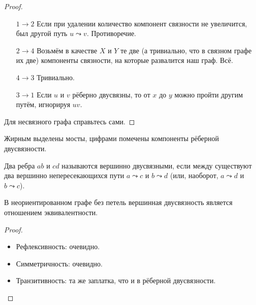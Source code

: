 \documentclass{article}
\begin{document}
    \begin{proof}
        \begin{itemize}
            \item[$1\to2$] Если при удалении количество компонент связности не увеличится, был другой путь $u\leadsto v$. Противоречие.
            \item[$2\to4$] Возьмём в качестве $X$ и $Y$ те две (а тривиально, что в связном графе их две) компоненты связности, на которые развалится наш граф. Всё.
            \item[$4\to3$] Тривиально.
            \item[$3\to1$] Если $u$ и $v$ рёберно двусвязны, то от $x$ до $y$ можно пройти другим путём, игнорируя $uv$.
        \end{itemize}
        Для несвязного графа справьтесь сами.
    \end{proof}
    \begin{example}
        Жирным выделены мосты, цифрами помечены компоненты рёберной двусвязности.
        \begin{figure}[H]
        \end{figure}\noindent
    \end{example}
    \begin{definition}
        Два ребра $ab$ и $cd$ называются вершинно двусвязными, если между существуют два вершинно непересекающихся пути $a\leadsto c$ и $b\leadsto d$ (или, наоборот, $a\leadsto d$ и $b\leadsto c$).
    \end{definition}
    \begin{theorem}
        В неориентированном графе без петель вершинная двусвязность является отношением эквивалентности.
    \end{theorem}
    \begin{proof}
        \begin{itemize}
            \item Рефлексивность: очевидно.
            \item Симметричность: очевидно.
            \item Транзитивность: та же заплатка, что и в рёберной двусвязности.
        \end{itemize}
    \end{proof}
\end{document}
